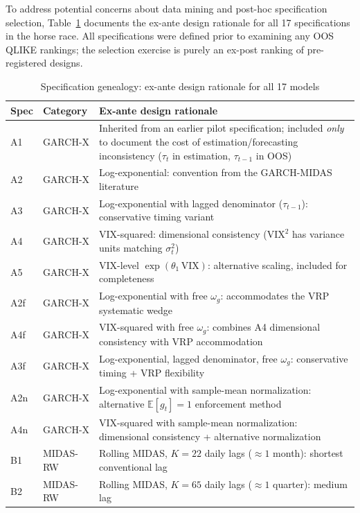 \documentclass[12pt,a4paper]{article}
\newcommand{\E}{\mathbb{E}}
\begin{document}
To address potential concerns about data mining and post-hoc specification selection, Table~\ref{tab:spec_genealogy} documents the ex-ante design rationale for all 17 specifications in the horse race. All specifications were defined prior to examining any OOS QLIKE rankings; the selection exercise is purely an ex-post ranking of pre-registered designs.

\begin{table}[H]
\centering
\caption{Specification genealogy: ex-ante design rationale for all 17 models}
\label{tab:spec_genealogy}
\begin{threeparttable}
\small
\begin{tabular}{@{}llp{7.5cm}@{}}
\toprule
Spec & Category & Ex-ante design rationale \\
\midrule
A1 & GARCH-X & Inherited from an earlier pilot specification; included \emph{only} to document the cost of estimation/forecasting inconsistency ($\tau_t$ in estimation, $\tau_{t-1}$ in OOS) \\
A2 & GARCH-X & Log-exponential: convention from the GARCH-MIDAS literature \citep{engle2013} \\
A3 & GARCH-X & Log-exponential with lagged denominator ($\tau_{t-1}$): conservative timing variant \\
A4 & GARCH-X & VIX-squared: dimensional consistency ($\mathrm{VIX}^2$ has variance units matching $\sigma_t^2$) \\
A5 & GARCH-X & VIX-level $\exp(\theta_1\,\mathrm{VIX})$: alternative scaling, included for completeness \\
A2f & GARCH-X & Log-exponential with free $\omega_g$: accommodates the VRP systematic wedge \\
A4f & GARCH-X & VIX-squared with free $\omega_g$: combines A4 dimensional consistency with VRP accommodation \\
A3f & GARCH-X & Log-exponential, lagged denominator, free $\omega_g$: conservative timing + VRP flexibility \\
A2n & GARCH-X & Log-exponential with sample-mean normalization: alternative $\E[g_t]=1$ enforcement method \\
A4n & GARCH-X & VIX-squared with sample-mean normalization: dimensional consistency + alternative normalization \\
\midrule
B1 & MIDAS-RW & Rolling MIDAS, $K=22$ daily lags ($\approx\!1$ month): shortest conventional lag \citep{engle2013} \\
B2 & MIDAS-RW & Rolling MIDAS, $K=65$ daily lags ($\approx\!1$ quarter): medium lag \\

\end{tabular}
\end{threeparttable}
\end{table}
\end{document}
